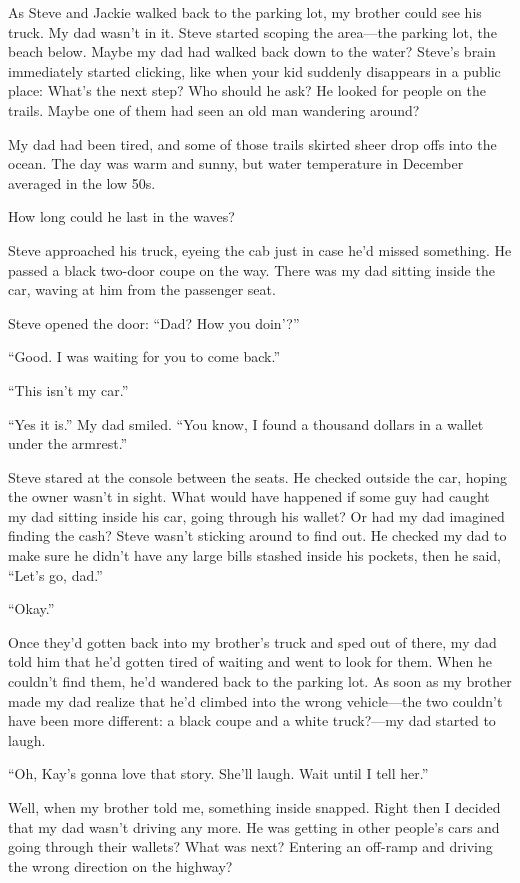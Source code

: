 \documentclass[12pt]{book}
\begin{document}
As Steve and Jackie walked back to the parking lot, my brother could see his truck. My dad wasn't in it. Steve started scoping the area---the parking lot, the beach below. Maybe my dad had walked back down to the water? Steve's brain immediately started clicking, like when your kid suddenly disappears in a public place: What's the next step? Who should he ask? He looked for people on the trails. Maybe one of them had seen an old man wandering around?

My dad had been tired, and some of those trails skirted sheer drop offs into the ocean. The day was warm and sunny, but water temperature in December averaged in the low 50s.

How long could he last in the waves?

Steve approached his truck, eyeing the cab just in case he'd missed something. He passed a black two-door coupe on the way. There was my dad sitting inside the car, waving at him from the passenger seat.

Steve opened the door: ``Dad? How you doin'?''

``Good. I was waiting for you to come back.''

``This isn't my car.''

``Yes it is.'' My dad smiled. ``You know, I found a thousand dollars in a wallet under the armrest.''

Steve stared at the console between the seats. He checked outside the car, hoping the owner wasn't in sight. What would have happened if some guy had caught my dad sitting inside his car, going through his wallet? Or had my dad imagined finding the cash? Steve wasn't sticking around to find out. He checked my dad to make sure he didn't have any large bills stashed inside his pockets, then he said, ``Let's go, dad.''

``Okay.''

Once they'd gotten back into my brother's truck and sped out of there, my dad told him that he'd gotten tired of waiting and went to look for them. When he couldn't find them, he'd wandered back to the parking lot. As soon as my brother made my dad realize that he'd climbed into the wrong vehicle---the two couldn't have been more different: a black coupe and a white truck?---my dad started to laugh.

``Oh, Kay's gonna love that story. She'll laugh. Wait until I tell her.''

Well, when my brother told me, something inside snapped. Right then I decided that my dad wasn't driving any more. He was getting in other people's cars and going through their wallets? What was next? Entering an off-ramp and driving the wrong direction on the highway?
\end{document}
